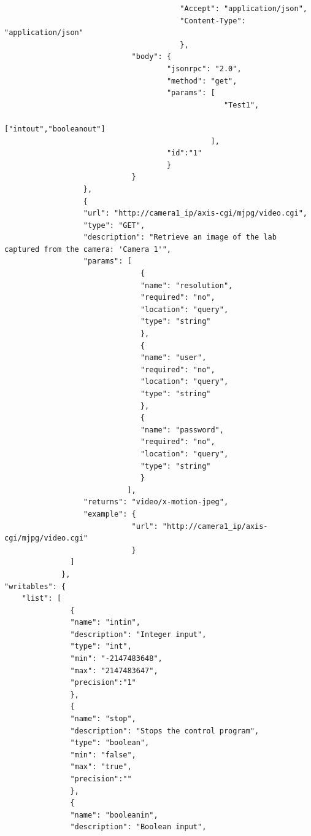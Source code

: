 \begin{lstlisting}
                                        "Accept": "application/json",
                                        "Content-Type": "application/json"
                                        },
                             "body": {
                                     "jsonrpc": "2.0",
                                     "method": "get",
                                     "params": [
                                                  "Test1",
                                                  ["intout","booleanout"]
                                               ],
                                     "id":"1"
                                     }
                             }
                  },
                  {
                  "url": "http://camera1_ip/axis-cgi/mjpg/video.cgi",
                  "type": "GET",
                  "description": "Retrieve an image of the lab captured from the camera: 'Camera 1'",
                  "params": [
                               {
                               "name": "resolution",
                               "required": "no",
                               "location": "query",
                               "type": "string"
                               },
                               {
                               "name": "user",
                               "required": "no",
                               "location": "query",
                               "type": "string"
                               },
                               {
                               "name": "password",
                               "required": "no",
                               "location": "query",
                               "type": "string"
                               }
                            ],
                  "returns": "video/x-motion-jpeg",
                  "example": {
                             "url": "http://camera1_ip/axis-cgi/mjpg/video.cgi"
                             }
               ]
             },
"writables": {
    "list": [
               {
               "name": "intin",
               "description": "Integer input",
               "type": "int",
               "min": "-2147483648",
               "max": "2147483647",
               "precision":"1"
               },
               {
               "name": "stop",
               "description": "Stops the control program",
               "type": "boolean",
               "min": "false",
               "max": "true",
               "precision":""
               },
               {
               "name": "booleanin",
               "description": "Boolean input",

\end{lstlisting}
